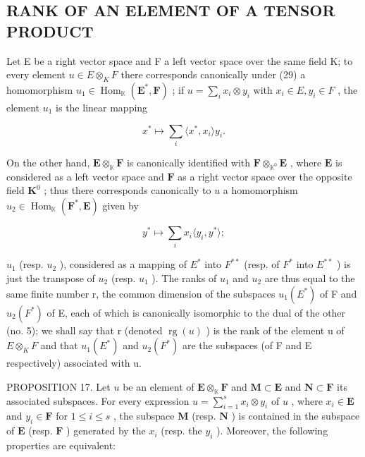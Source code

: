 \subsection{RANK OF AN ELEMENT OF A TENSOR PRODUCT}

Let E be a right vector space and F a left vector space over the same field K; to every element \(u \in E \otimes_{K} F\) there corresponds canonically under (29) a homomorphism \(u_{1} \in \operatorname{Hom}_{\mathbb{K}}(\mathbf{E}^{*}, \mathbf{F})\) ; if \(u = \sum_{i} x_{i} \otimes y_{i}\) with \(x_{i} \in E, y_{i} \in F\) , the element \(u_{1}\) is the linear mapping

\[
x ^ {*} \mapsto \sum_ {i} \langle x ^ {*}, x _ {i} \rangle y _ {i}.\tag{33}
\]

On the other hand, \(\mathbf{E} \otimes_{\mathbb{K}} \mathbf{F}\) is canonically identified with \(\mathbf{F} \otimes_{\mathbb{K}^0} \mathbf{E}\) , where \(\mathbf{E}\) is considered as a left vector space and \(\mathbf{F}\) as a right vector space over the opposite field \(\mathbf{K}^0\) ; thus there corresponds canonically to \(u\) a homomorphism \(u_2 \in \operatorname{Hom}_{\mathbb{K}}(\mathbf{F}^*, \mathbf{E})\) given by

\[
y ^ {*} \mapsto \sum_ {i} x _ {i} \langle y _ {i}, y ^ {*} \rangle ;\tag{34}
\]

\(u_{1}\) (resp. \(u_{2}\) ), considered as a mapping of \(E^{*}\) into \(F^{**}\) (resp. of \(F^{*}\) into \(E^{**}\) ) is just the transpose of \(u_{2}\) (resp. \(u_{1}\) ). The ranks of \(u_{1}\) and \(u_{2}\) are thus equal to the same finite number r, the common dimension of the subspaces \(u_{1}(E^{*})\) of F and \(u_{2}(F^{*})\) of E, each of which is canonically isomorphic to the dual of the other (no. 5); we shall say that r (denoted \(\operatorname{rg}(u)\) ) is the rank of the element u of \(E \otimes_{K} F\) and that \(u_{1}(E^{*})\) and \(u_{2}(F^{*})\) are the subspaces (of F and E respectively) associated with u.

PROPOSITION 17. Let \(u\) be an element of \(\mathbf{E} \otimes_{\mathbb{K}} \mathbf{F}\) and \(\mathbf{M} \subset \mathbf{E}\) and \(\mathbf{N} \subset \mathbf{F}\) its associated subspaces. For every expression \(u = \sum_{i=1}^{s} x_i \otimes y_i\) of \(u\) , where \(x_i \in \mathbf{E}\) and \(y_i \in \mathbf{F}\) for \(1 \leqslant i \leqslant s\) , the subspace \(\mathbf{M}\) (resp. \(\mathbf{N}\) ) is contained in the subspace of \(\mathbf{E}\) (resp. \(\mathbf{F}\) ) generated by the \(x_i\) (resp. the \(y_i\) ). Moreover, the following properties are equivalent:

